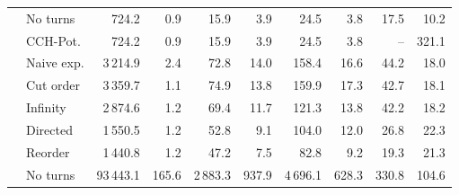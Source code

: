 \begin{tabular}{llrrrrrrrr}
\addlinespace \multirow{7}{*}{\rotatebox[origin=c]{90}{Stuttgart}} & No turns &                    724.2 &             0.9 &                                            15.9 &                                              3.9 &                                              24.5 &                                                3.8 &   17.5 &   10.2 \\
       & CCH-Pot. &                    724.2 &             0.9 &                                            15.9 &                                              3.9 &                                              24.5 &                                                3.8 &    -- &  321.1 \\
       & Naive exp. &                   3\,214.9 &             2.4 &                                            72.8 &                                             14.0 &                                             158.4 &                                               16.6 &   44.2 &   18.0 \\
       & Cut order &                   3\,359.7 &             1.1 &                                            74.9 &                                             13.8 &                                             159.9 &                                               17.3 &   42.7 &   18.1 \\
       & Infinity &                   2\,874.6 &             1.2 &                                            69.4 &                                             11.7 &                                             121.3 &                                               13.8 &   42.2 &   18.2 \\
       & Directed &                   1\,550.5 &             1.2 &                                            52.8 &                                              9.1 &                                             104.0 &                                               12.0 &   26.8 &   22.3 \\
       & Reorder &                   1\,440.8 &             1.2 &                                            47.2 &                                              7.5 &                                              82.8 &                                                9.2 &   19.3 &   21.3 \\
\addlinespace \multirow{7}{*}{\rotatebox[origin=c]{90}{Germany}} & No turns &                  93\,443.1 &           165.6 &                                          2\,883.3 &                                            937.9 &                                            4\,696.1 &                                              628.3 &  330.8 &  104.6 \\

\end{tabular}
